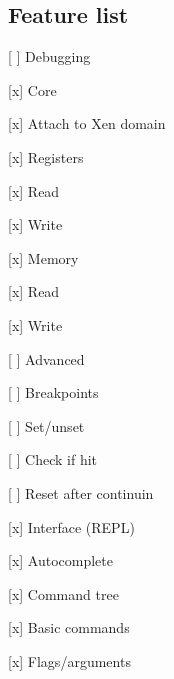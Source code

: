 \subsection*{Feature list}


\begin{DoxyItemize}
\item \mbox{[} \mbox{]} Debugging
\begin{DoxyItemize}
\item \mbox{[}x\mbox{]} Core
\begin{DoxyItemize}
\item \mbox{[}x\mbox{]} Attach to Xen domain
\item \mbox{[}x\mbox{]} Registers
\begin{DoxyItemize}
\item \mbox{[}x\mbox{]} Read
\item \mbox{[}x\mbox{]} Write
\end{DoxyItemize}
\item \mbox{[}x\mbox{]} Memory
\begin{DoxyItemize}
\item \mbox{[}x\mbox{]} Read
\item \mbox{[}x\mbox{]} Write
\end{DoxyItemize}
\end{DoxyItemize}
\item \mbox{[} \mbox{]} Advanced
\begin{DoxyItemize}
\item \mbox{[} \mbox{]} Breakpoints
\begin{DoxyItemize}
\item \mbox{[} \mbox{]} Set/unset
\item \mbox{[} \mbox{]} Check if hit
\item \mbox{[} \mbox{]} Reset after continuin
\end{DoxyItemize}
\end{DoxyItemize}
\end{DoxyItemize}
\item \mbox{[}x\mbox{]} Interface (R\+E\+PL)
\begin{DoxyItemize}
\item \mbox{[}x\mbox{]} Autocomplete
\item \mbox{[}x\mbox{]} Command tree
\begin{DoxyItemize}
\item \mbox{[}x\mbox{]} Basic commands
\item \mbox{[}x\mbox{]} Flags/arguments
\end{DoxyItemize}

\end{DoxyItemize}
\end{DoxyItemize}

